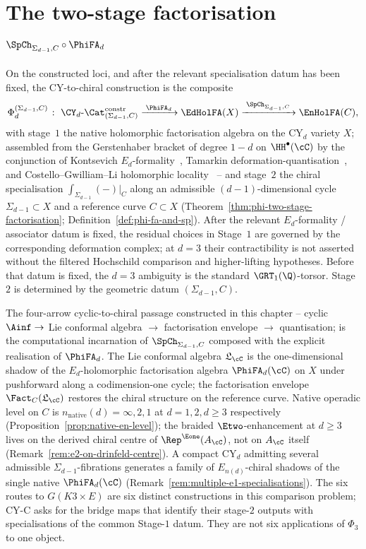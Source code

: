 \section{The two-stage factorisation \texorpdfstring{$\SpCh_{\Sigma_{d-1}, C}\circ\PhiFA_d$}{SpCh-Sigma-d-1-C o PhiFA-d}}
\label{sec:two-stage-organising-frame}

On the constructed loci, and after the relevant specialisation datum has
been fixed, the CY-to-chiral construction is the composite
 \[
 \Phi_d^{(\Sigma_{d-1}, C)} \;\colon\;
 \CY_d\text{-}\Cat^{\mathrm{constr}}_{(\Sigma_{d-1},C)}
 \xrightarrow{\;\PhiFA_d\;}
 \EdHolFA(X)
 \xrightarrow{\;\SpCh_{\Sigma_{d-1}, C}\;}
 \EnHolFA(C),
\]
with stage~$1$ the native holomorphic factorisation algebra on the
CY$_d$ variety $X$; assembled from the Gerstenhaber bracket of degree
$1 - d$ on $\HH^\bullet(\cC)$ by the conjunction of Kontsevich
$E_d$-formality~\cite{Kontsevich1999}, Tamarkin
deformation-quantisation~\cite{Tamarkin2007}, and
Costello--Gwilliam--Li holomorphic
locality~\cite{CostelloGwilliam2017,CostelloLi2016,CostelloLi2020} --
and stage~$2$ the chiral specialisation $\int_{\Sigma_{d - 1}}(-)|_C$
along an admissible $(d - 1)$-dimensional cycle
$\Sigma_{d - 1} \subset X$ and a reference curve $C \subset X$
(Theorem~\ref{thm:phi-two-stage-factorisation};
		Definition~\ref{def:phi-fa-and-sp}). After the relevant
	$E_d$-formality / associator datum is fixed, the residual choices in
	Stage~$1$ are governed by the corresponding deformation complex; at
	$d=3$ their contractibility is not asserted without the filtered
	Hochschild comparison and higher-lifting hypotheses. Before that datum
	is fixed, the $d=3$ ambiguity is the standard $\GRT_1(\Q)$-torsor.
Stage~$2$ is determined by the geometric datum $(\Sigma_{d-1}, C)$.

The four-arrow cyclic-to-chiral passage constructed in this chapter --
cyclic $\Ainf \to$ Lie conformal algebra $\to$ factorisation envelope
$\to$ quantisation; is the computational incarnation of
$\SpCh_{\Sigma_{d-1}, C}$ composed with the explicit realisation of
$\PhiFA_d$. The Lie conformal algebra $\mathfrak{L}_\cC$ is the
one-dimensional shadow of the $E_d$-holomorphic factorisation algebra
$\PhiFA_d(\cC)$ on $X$ under pushforward along a codimension-one cycle;
the factorisation envelope $\Fact_C(\mathfrak{L}_\cC)$ restores the
chiral structure on the reference curve. Native operadic level on $C$ is
$n_{\mathrm{native}}(d) = \infty, 2, 1$ at $d = 1, 2, d \geq 3$
respectively (Proposition~\ref{prop:native-en-level}); the braided
$\Etwo$-enhancement at $d \geq 3$ lives on the derived chiral centre of
$\Rep^{\Eone}(A_\cC)$, not on $A_\cC$ itself
(Remark~\ref{rem:e2-on-drinfeld-centre}). A compact CY$_d$ admitting
several admissible $\Sigma_{d-1}$-fibrations generates a family of
$E_{n(d)}$-chiral shadows of the single native $\PhiFA_d(\cC)$
(Remark~\ref{rem:multiple-e1-specialisations}). The six routes to
\(G(K3 \times E)\) are six distinct constructions in this comparison
problem; CY-C asks for the bridge maps that identify their stage-\(2\)
outputs with specialisations of the common Stage-\(1\) datum. They are
not six applications of \(\Phi_3\) to one object.


